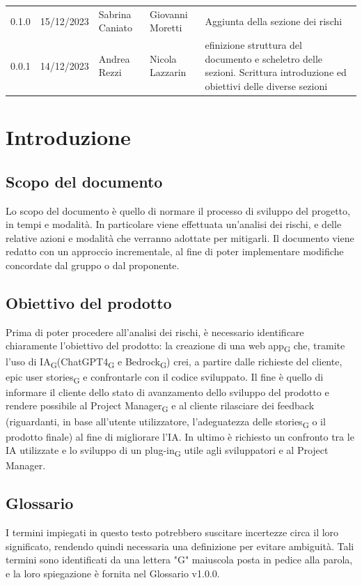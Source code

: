 \documentclass{article}
\begin{document}
\begin{center}
\begin{tabular}{P{5em} P{6em} P{8em} P{8em} P{10em}} 
    0.1.0 & 15/12/2023 & Sabrina Caniato & Giovanni Moretti & Aggiunta della sezione dei rischi\\
     0.0.1 & 14/12/2023 & Andrea Rezzi & Nicola Lazzarin & efinizione struttura del documento e scheletro delle sezioni. Scrittura introduzione ed obiettivi delle diverse sezioni\\ 
\end{tabular}
\end{center}
\newpage
\tableofcontents
\newpage
\section{Introduzione}
\subsection{Scopo del documento}
Lo scopo del documento è quello di normare il processo di sviluppo del progetto, in tempi e modalità. In particolare viene effettuata un'analisi dei rischi, e delle relative azioni e modalità che verranno adottate per mitigarli. Il documento viene redatto con un approccio incrementale, al fine di poter implementare modifiche concordate dal gruppo o dal proponente.

\subsection{Obiettivo del prodotto}
Prima di poter procedere all'analisi dei rischi, è necessario identificare chiaramente l'obiettivo del prodotto: la creazione di una web app\textsubscript{G} che, tramite l’uso di IA\textsubscript{G}(ChatGPT4\textsubscript{G} e Bedrock\textsubscript{G}) crei, a partire dalle richieste del cliente, epic user stories\textsubscript{G} e confrontarle con il codice sviluppato. Il fine è quello di informare il cliente dello stato di avanzamento dello sviluppo del prodotto e rendere possibile al Project Manager\textsubscript{G} e al cliente rilasciare dei
feedback (riguardanti, in base all'utente utilizzatore, l'adeguatezza delle stories\textsubscript{G} o il prodotto finale) al fine di migliorare l’IA. In ultimo è richiesto un confronto tra le IA utilizzate e lo sviluppo di un plug-in\textsubscript{G} utile agli sviluppatori e al Project Manager.

\subsection{Glossario}
I termini impiegati in questo testo potrebbero suscitare incertezze circa il loro significato, rendendo quindi necessaria una definizione per evitare ambiguità. Tali termini sono identificati da una lettera "G" maiuscola posta in pedice alla parola, e la loro spiegazione è fornita nel Glossario v1.0.0.
\end{document}

